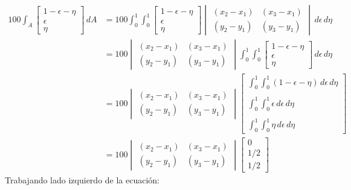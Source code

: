 \documentclass[10pt]{article}
\begin{document}
\begin{align*}
100 \int_A \begin{bmatrix} 1-\epsilon-\eta \\ \epsilon \\ \eta \end{bmatrix} \,d A &= 100 \int_{0}^{1} \int_{0}^{1} \begin{bmatrix} 1-\epsilon-\eta \\ \epsilon \\ \eta \end{bmatrix} \begin{vmatrix} (x_2-x_1) & (x_3-x_1) \\ 
(y_2-y_1) & (y_3-y_1) \end{vmatrix} \,d \epsilon \,d \eta \\
&= 100 \begin{vmatrix} (x_2-x_1) & (x_3-x_1) \\ 
(y_2-y_1) & (y_3-y_1) \end{vmatrix} \int_{0}^{1} \int_{0}^{1} \begin{bmatrix} 1-\epsilon-\eta \\ \epsilon \\ \eta \end{bmatrix} \,d \epsilon \,d \eta \\
&= 100 \begin{vmatrix} (x_2-x_1) & (x_3-x_1) \\ 
(y_2-y_1) & (y_3-y_1) \end{vmatrix} \begin{bmatrix} \int_{0}^{1} \int_{0}^{1} (1-\epsilon-\eta) \,d \epsilon \,d \eta \\ \\ \int_{0}^{1} \int_{0}^{1} \epsilon \,d \epsilon \,d \eta  \\ \\ \int_{0}^{1} \int_{0}^{1} \eta \,d \epsilon \,d \eta  \end{bmatrix} \\
& = 100 \begin{vmatrix} (x_2-x_1) & (x_3-x_1) \\ 
(y_2-y_1) & (y_3-y_1) \end{vmatrix} \begin{bmatrix} 
0 \\ 1/2 \\ 1/2
\end{bmatrix}
\end{align*} 
\newpage
Trabajando lado izquierdo de la ecuaci\'on: \\
\end{document}
